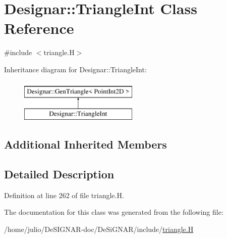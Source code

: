 \hypertarget{class_designar_1_1_triangle_int}{}\section{Designar\+:\+:Triangle\+Int Class Reference}
\label{class_designar_1_1_triangle_int}


{\ttfamily \#include $<$triangle.\+H$>$}

Inheritance diagram for Designar\+:\+:Triangle\+Int\+:\begin{figure}[H]
\begin{center}
\leavevmode
\includegraphics[height=2.000000cm]{class_designar_1_1_triangle_int}
\end{center}
\end{figure}
\subsection*{Additional Inherited Members}


\subsection{Detailed Description}


Definition at line 262 of file triangle.\+H.



The documentation for this class was generated from the following file\+:\begin{DoxyCompactItemize}
\item 
/home/julio/\+De\+S\+I\+G\+N\+A\+R-\/doc/\+De\+Si\+G\+N\+A\+R/include/\hyperlink{triangle_8_h}{triangle.\+H}\end{DoxyCompactItemize}
